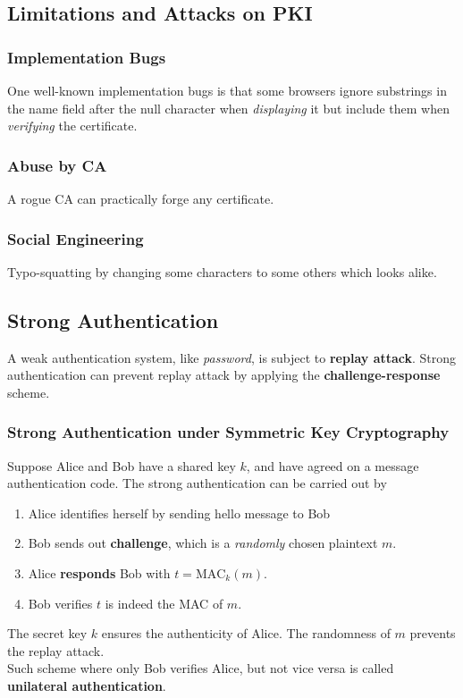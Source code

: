 \documentclass[12pt]{article}
\theoremstyle{definition}
\begin{document}
\subsection{Limitations and Attacks on PKI}
\subsubsection{Implementation Bugs}
One well-known implementation bugs is that some browsers ignore substrings in the name field after the null character when \textit{displaying} it but include them when \textit{verifying} the certificate.
\subsubsection{Abuse by CA}
A rogue CA can practically forge any certificate.
\subsubsection{Social Engineering}
Typo-squatting by changing some characters to some others which looks alike.
\subsection{Strong Authentication}
A weak authentication system, like \textit{password}, is subject to \textbf{replay attack}. Strong authentication can prevent replay attack by applying the \textbf{challenge-response} scheme.
\subsubsection{Strong Authentication under Symmetric Key Cryptography}
Suppose Alice and Bob have a shared key $k$, and have agreed on a message authentication code. The strong authentication can be carried out by
\begin{enumerate}
  \item Alice identifies herself by sending hello message to Bob
  \item Bob sends out \textbf{challenge}, which is a \textit{randomly} chosen plaintext $m$.
  \item Alice \textbf{responds} Bob with $t=\text{MAC}_k(m)$.
  \item Bob verifies $t$ is indeed the MAC of $m$.
\end{enumerate}
The secret key $k$ ensures the authenticity of Alice. The randomness of $m$ prevents the replay attack.\\
Such scheme where only Bob verifies Alice, but not vice versa is called \textbf{unilateral authentication}.
\end{document}
